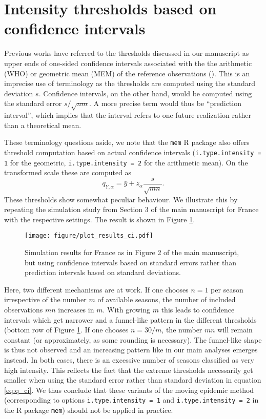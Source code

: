 \documentclass{article}
\newcommand{\sd}{s}
\begin{document}
\newpage

\section{Intensity thresholds based on confidence intervals}

Previous works have referred to the thresholds discussed in our manuscript as upper ends of one-sided confidence intervals associated with the the arithmetic (WHO) or geometric mean (MEM) of the reference observations (\citealt{WHO2014, Vega2015}). This is an imprecise use of terminology as the thresholds are computed using the standard deviation $\sd$. Confidence intervals, on the other hand, would be computed using the standard error $\sd/\sqrt{nm}$. A more precise term would thus be ``prediction interval'', which implies that the interval refers to one future realization rather than a theoretical mean.

These terminology questions aside, we note that the \texttt{mem} R package also offers threshold computation based on actual confidence intervals (\texttt{i.type.intensity = 1} for the geometric, \texttt{i.type.intensity = 2} for the arithmetic mean). On the transformed scale these are computed as
\begin{equation}
q_{Y, \alpha} = \bar{y} + z_\alpha \frac{\sd}{\sqrt{mn}}. \label{eq:q_ci}
\end{equation}
These thresholds show somewhat peculiar behaviour. We illustrate this by repeating the simulation study from Section 3 of the main manuscript for France with the respective settings. The result is shown in Figure \ref{fig:france_ci}.

\begin{figure}[h!]
\texttt{[image: figure/plot\_results\_ci.pdf]}
\caption{Simulation results for France as in Figure 2 of the main manuscript, but using confidence intervals based on standard errors rather than prediction intervals based on standard deviations.}
\label{fig:france_ci}
\end{figure}

Here, two different mechanisms are at work. If one chooses $n = 1$ per season irrespective of the number $m$ of available seasons, the number of included observations $mn$ increases in $m$. With growing $m$ this leads to confidence intervals which get narrower and a funnel-like pattern in the different thresholds (bottom row of Figure \ref{fig:france_ci}. If one chooses $n = 30/m$, the number $mn$ will remain constant (or approximately, as some rounding is necessary). The funnel-like shape is thus not observed and an increasing pattern like in our main analyses emerges instead. In both cases, there is an excessive number of seasons classified as very high intensity. This reflects the fact that the extreme thresholds necessarily get smaller when using the standard error rather than standard deviation in equation \eqref{eq:q_ci}. We thus conclude that these variants of the moving epidemic method (corresponding to options \texttt{i.type.intensity = 1} and  \texttt{i.type.intensity = 2} in the R package \texttt{mem}) should not be applied in practice.
\end{document}

